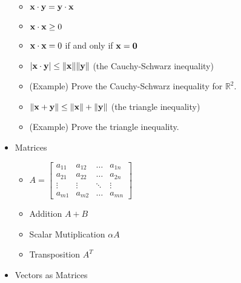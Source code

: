 \documentclass[11pt]{article}
\begin{document}
\begin{itemize}
\begin{itemize}
      \item
        \(
          \mathbf{x}\cdot\mathbf{y}
            =
          \mathbf{y}\cdot\mathbf{x}
        \)
      \item
        \(
          \mathbf{x}\cdot\mathbf{x} \geq 0
        \)
      \item
        \(
          \mathbf{x}\cdot\mathbf{x} = 0
        \)
        if and only if
        \(
          \mathbf{x}=\mathbf{0}
        \)
      \item
        \(
          |\mathbf{x}\cdot\mathbf{y}|
            \leq
          \|\mathbf{x}\|\|\mathbf{y}\|
        \)
        (the Cauchy-Schwarz inequality)
      \item (Example) Prove the Cauchy-Schwarz inequality for \(\mathbb R^2\).
      \item
        \(
          \|\mathbf{x}+\mathbf{y}\|
            \leq
          \|\mathbf{x}\|+\|\mathbf{y}\|
        \)
        (the triangle inequality)
      \item (Example) Prove the triangle inequality.
    \end{itemize}
  \item Matrices
    \begin{itemize}
      \item
        \(
          A
            =
          \begin{bmatrix}
            a_{11} & a_{12} & \dots  & a_{1n} \\
            a_{21} & a_{22} & \dots  & a_{2n} \\
            \vdots & \vdots & \ddots & \vdots \\
            a_{m1} & a_{m2} & \dots  & a_{mn}
          \end{bmatrix}
        \)
      \item Addition \(A+B\)
      \item Scalar Mutiplication \(\alpha A\)
      \item Transposition \(A^T\)
    \end{itemize}
  \item Vectors as Matrices
\end{itemize}
\end{document}
